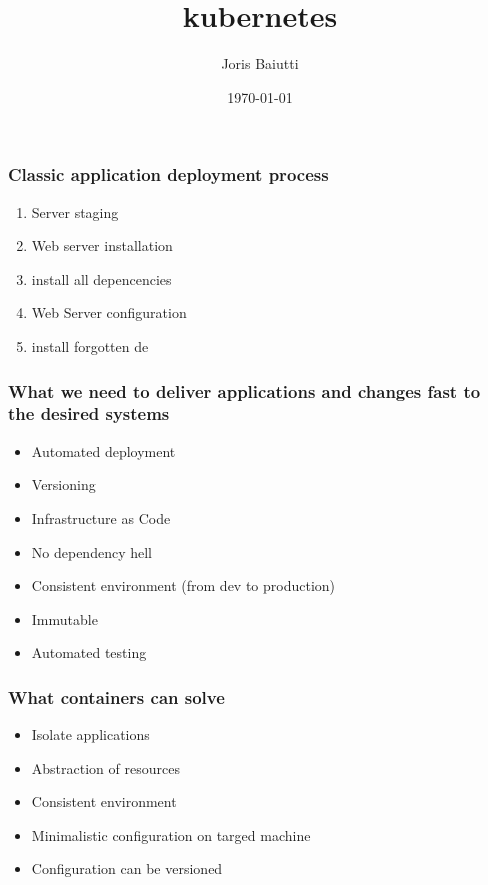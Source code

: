 \documentclass{beamer}
\title{kubernetes}
\author{Joris Baiutti}
\institute{Berner Fachhochschule}
\date{\today}
\begin{document}
\begin{frame}
\titlepage
\end{frame}

\begin{frame}
\frametitle{Classic application deployment process}
\begin{enumerate}
    \item Server staging
    \item Web server installation
    \item install all depencencies
    \item Web Server configuration
    \item install forgotten de
\end{enumerate}
    
\end{frame}

\begin{frame}
\frametitle{What we need to deliver applications and changes fast to the desired systems}
\begin{itemize}
    \item Automated deployment
    \item Versioning
    \item Infrastructure as Code
    \item No dependency hell
    \item Consistent environment (from dev to production)
    \item Immutable
    \item Automated testing
\end{itemize}
\end{frame}

\begin{frame}
\frametitle{What containers can solve}
\begin{itemize}
    \item Isolate applications
    \item Abstraction of resources
    \item Consistent environment
    \item Minimalistic configuration on targed machine
    \item Configuration can be versioned
\end{itemize}
\end{frame}
\end{document}

